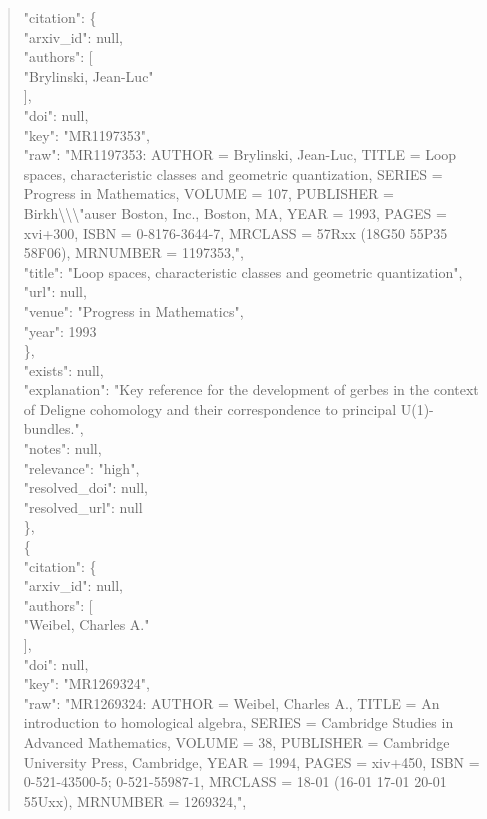 \documentclass[11pt]{article}
\begin{document}
\begin{quote}
      "citation": \{\\
        "arxiv\_id": null,\\
        "authors": [\\
          "Brylinski, Jean-Luc"\\
        ],\\
        "doi": null,\\
        "key": "MR1197353",\\
        "raw": "MR1197353: AUTHOR = Brylinski, Jean-Luc, TITLE = Loop spaces, characteristic classes and geometric quantization, SERIES = Progress in Mathematics, VOLUME = 107, PUBLISHER = Birkh\textbackslash{}\textbackslash{}\textbackslash{}"auser Boston, Inc., Boston, MA, YEAR = 1993, PAGES = xvi+300, ISBN = 0-8176-3644-7, MRCLASS = 57Rxx (18G50 55P35 58F06), MRNUMBER = 1197353,",\\
        "title": "Loop spaces, characteristic classes and geometric quantization",\\
        "url": null,\\
        "venue": "Progress in Mathematics",\\
        "year": 1993\\
      \},\\
      "exists": null,\\
      "explanation": "Key reference for the development of gerbes in the context of Deligne cohomology and their correspondence to principal U(1)-bundles.",\\
      "notes": null,\\
      "relevance": "high",\\
      "resolved\_doi": null,\\
      "resolved\_url": null\\
    \},\\
    \{\\
      "citation": \{\\
        "arxiv\_id": null,\\
        "authors": [\\
          "Weibel, Charles A."\\
        ],\\
        "doi": null,\\
        "key": "MR1269324",\\
        "raw": "MR1269324: AUTHOR = Weibel, Charles A., TITLE = An introduction to homological algebra, SERIES = Cambridge Studies in Advanced Mathematics, VOLUME = 38, PUBLISHER = Cambridge University Press, Cambridge, YEAR = 1994, PAGES = xiv+450, ISBN = 0-521-43500-5; 0-521-55987-1, MRCLASS = 18-01 (16-01 17-01 20-01 55Uxx), MRNUMBER = 1269324,",\\

\end{quote}
\end{document}
